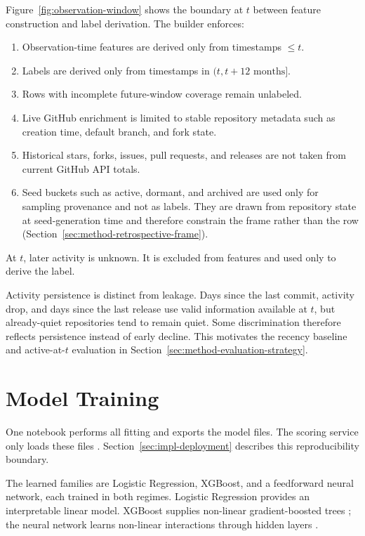 Figure~\ref{fig:observation-window} shows the boundary at \(t\) between feature
construction and label derivation. The builder enforces:

\begin{enumerate}
    \item Observation-time features are derived only from timestamps \( \leq t \).
    \item Labels are derived only from timestamps in \( (t, t + 12\text{ months}] \).
    \item Rows with incomplete future-window coverage remain unlabeled.
    \item Live GitHub enrichment is limited to stable repository metadata such as creation time, default branch, and fork state.
    \item Historical stars, forks, issues, pull requests, and releases are not taken from current GitHub API totals.
    \item Seed buckets such as active, dormant, and archived are used only for sampling provenance and not as labels. They are drawn from repository state at seed-generation time and therefore constrain the frame rather than the row (Section~\ref{sec:method-retrospective-frame}).
\end{enumerate}

At \(t\), later activity is unknown. It is excluded from features and used only
to derive the label.

Activity persistence is distinct from leakage. Days since the last commit,
activity drop, and days since the last release use valid information available at
\(t\), but already-quiet repositories tend to remain quiet. Some discrimination
therefore reflects persistence instead of early decline. This motivates the
recency baseline and active-at-\(t\) evaluation in
Section~\ref{sec:method-evaluation-strategy}.

\section{Model Training}
\label{sec:method-model-training}

One notebook performs all fitting and exports the model files. The scoring
service only loads these files \cite{ossRiskRadarReadme}.
Section~\ref{sec:impl-deployment} describes this reproducibility boundary.

The learned families are Logistic Regression, XGBoost, and a feedforward neural
network, each trained in both regimes. Logistic Regression provides an
interpretable linear model. XGBoost supplies non-linear gradient-boosted trees
\cite{chen2016xgboost}; the neural network learns non-linear interactions through
hidden layers \cite{james2021islr}.

